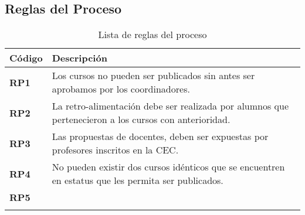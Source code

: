 
\subsection{Reglas del Proceso}
\begin{longtable}{p{5cm}|p{11cm}}%
		\hline
			\textbf{Código} & \textbf{Descripción}\\
		\hline\hline
			{{\color{blue}\textbf{RP1}}} & {Los cursos no pueden ser publicados sin antes ser aprobamos por los coordinadores.}\\ %
			\hline
			{{\color{blue}\textbf{RP2}}}  & {La retro-alimentación debe ser realizada por alumnos que pertenecieron a los cursos con anterioridad.}\\
		\hline
			{{\color{blue}\textbf{RP3}}}  & {Las propuestas de docentes, deben ser expuestas por profesores inscritos en la CEC.}\\
		\hline
			{{\color{blue}\textbf{RP4}}}  & {No pueden existir dos cursos idénticos que se encuentren en estatus que les permita ser publicados.}\\
		\hline
			{{\color{blue}\textbf{RP5}}}  & {}\\
		\hline
\caption{Lista de reglas del proceso}
\end{longtable}

